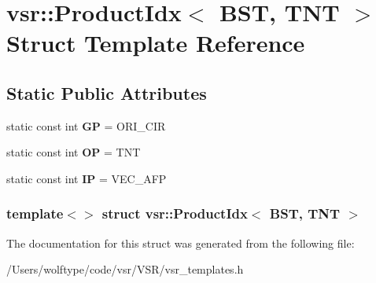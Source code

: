 \hypertarget{structvsr_1_1_product_idx_3_01_b_s_t_00_01_t_n_t_01_4}{\section{vsr\-:\-:Product\-Idx$<$ B\-S\-T, T\-N\-T $>$ Struct Template Reference}
\label{structvsr_1_1_product_idx_3_01_b_s_t_00_01_t_n_t_01_4}
}
\subsection*{Static Public Attributes}
\begin{DoxyCompactItemize}
\item 
\hypertarget{structvsr_1_1_product_idx_3_01_b_s_t_00_01_t_n_t_01_4_ac6bf07260f89d80faac7fa39d9f2430c}{static const int {\bfseries G\-P} = O\-R\-I\-\_\-\-C\-I\-R}\label{structvsr_1_1_product_idx_3_01_b_s_t_00_01_t_n_t_01_4_ac6bf07260f89d80faac7fa39d9f2430c}

\item 
\hypertarget{structvsr_1_1_product_idx_3_01_b_s_t_00_01_t_n_t_01_4_a87b8804d9016c4a3be58b534048b88b8}{static const int {\bfseries O\-P} = T\-N\-T}\label{structvsr_1_1_product_idx_3_01_b_s_t_00_01_t_n_t_01_4_a87b8804d9016c4a3be58b534048b88b8}

\item 
\hypertarget{structvsr_1_1_product_idx_3_01_b_s_t_00_01_t_n_t_01_4_a2f680ef7b3476ccf4bfc7f1c7127254b}{static const int {\bfseries I\-P} = V\-E\-C\-\_\-\-A\-F\-P}\label{structvsr_1_1_product_idx_3_01_b_s_t_00_01_t_n_t_01_4_a2f680ef7b3476ccf4bfc7f1c7127254b}

\end{DoxyCompactItemize}
\subsubsection*{template$<$$>$ struct vsr\-::\-Product\-Idx$<$ B\-S\-T, T\-N\-T $>$}



The documentation for this struct was generated from the following file\-:\begin{DoxyCompactItemize}
\item 
/\-Users/wolftype/code/vsr/\-V\-S\-R/vsr\-\_\-templates.\-h\end{DoxyCompactItemize}
